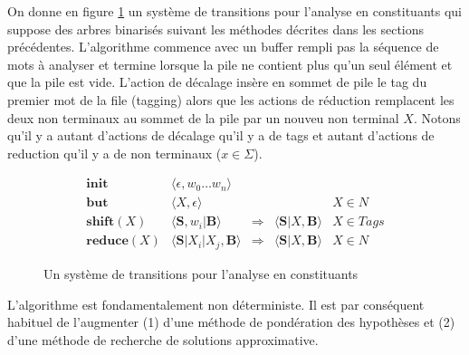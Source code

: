 \documentclass[11pt,openany]{book}
\begin{document}
On donne en figure \ref{fig-transition-cfg} un système de transitions pour l'analyse en constituants qui suppose des arbres binarisés 
suivant les méthodes décrites dans les sections précédentes. L'algorithme commence avec un buffer rempli pas la séquence de mots à analyser
et termine lorsque la pile ne contient plus qu'un seul élément et que la pile est vide. L'action de décalage insère en sommet de pile le tag du premier mot de la file
(tagging) alors que les actions de réduction remplacent les deux non terminaux au sommet de la pile par un nouveu 
non terminal $X$. Notons qu'il y a autant d'actions de décalage qu'il y a de tags et autant d'actions de reduction qu'il y a de non terminaux ($x\in \Sigma$).

\begin{figure}[htbp]
\begin{displaymath}
\begin{array}{rccll}
\mathbf{init}  &\langle \epsilon , w_0 \ldots w_n \rangle\\
\mathbf{but}  & \langle X ,\epsilon  \rangle & &&X\in N \\
\mathbf{shift}(X) & \langle \mathbf{S} ,  w_i | \mathbf{B}  \rangle
&\Rightarrow &\langle \mathbf{S} | X ,  \mathbf{B}    \rangle & X\in Tags\\
\mathbf{reduce}(X) &\langle \mathbf{S}| X_i | X_j , \mathbf{B}\rangle 
&\Rightarrow& \langle \mathbf{S}| X , \mathbf{B}  \rangle&X \in N
\end{array}
\end{displaymath}
\caption{\label{fig-transition-cfg}Un système de transitions pour l'analyse en constituants}
\end{figure}

L’algorithme est fondamentalement non déterministe. 
Il est par conséquent habituel de l’augmenter (1) d’une méthode de pondération des hypothèses et 
(2) d’une méthode de recherche de solutions approximative.
\end{document}
